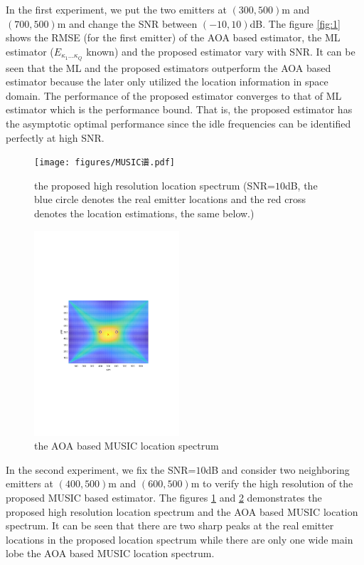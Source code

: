 \documentclass[journal,10pt]{IEEEtran}
\begin{document}
In the first experiment, we put the two emitters at $(300,500)$m and $(700,500)$m and change the SNR between $(-10,10)$dB.
The figure \ref{fig:1} shows the RMSE (for the first emitter) of the AOA based estimator, the ML estimator ($E_{\kappa_1\dots\kappa_Q}$ known) and the proposed estimator vary with SNR. 
It can be seen that the ML and the proposed estimators outperform the AOA based estimator because the later only utilized the location information in space domain.
The performance of the proposed estimator converges to that of ML estimator which is the performance bound. That is, the proposed estimator has the asymptotic optimal performance 
since the idle frequencies can be identified perfectly at high SNR.

\begin{figure}[!t] 
	\centerline{\texttt{[image: figures/MUSIC谱.pdf]}}
	\caption{the proposed high resolution location spectrum (SNR=$10$dB, the blue circle denotes the real emitter locations and the red cross denotes the location estimations, the same below.)}\label{fig:2}
\end{figure}

\begin{figure}[!t] 
	\centerline{\includegraphics[width=0.48\textwidth]{figures/SML位置谱.pdf}}
	\caption{the AOA based MUSIC location spectrum}\label{fig:3}
\end{figure}

In the second experiment, we fix the SNR=$10$dB and consider two neighboring emitters at $(400,500)$m and $(600,500)$m to verify the high resolution of the proposed MUSIC based estimator. 
The figures \ref{fig:2} and \ref{fig:3} demonstrates the proposed high resolution location spectrum and the AOA based MUSIC location spectrum. It can be seen that there are two sharp peaks at the real emitter locations in the proposed location spectrum 
while there are only one wide main lobe the AOA based MUSIC location spectrum.
\end{document}
